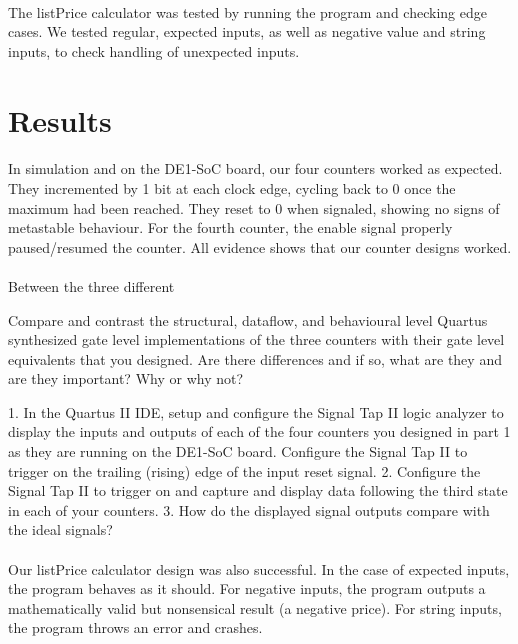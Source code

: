 \documentclass{article}
\begin{document}
  \paragraph{} The listPrice calculator was tested by running the program and checking edge cases. We tested regular, expected inputs, as well as negative value and string inputs, to check handling of unexpected inputs.

\section{Results}

  \paragraph{} In simulation and on the DE1-SoC board, our four counters worked as expected. They incremented by 1 bit at each clock edge, cycling back to 0 once the maximum had been reached. They reset to 0 when signaled, showing no signs of metastable behaviour. For the fourth counter, the enable signal properly paused/resumed the counter. All evidence shows that our counter designs worked.

  \paragraph{} Between the three different

  Compare and contrast the structural, dataflow, and behavioural level Quartus synthesized gate level implementations of the three counters with their gate level equivalents that you designed. Are there differences and if so, what are they and are they important? Why or why not?

  1. In the Quartus II IDE, setup and configure the Signal Tap II logic analyzer to display the inputs and outputs of each of the four counters you designed in part 1 as they are running on the DE1-SoC board. Configure the Signal Tap II to trigger on the trailing (rising) edge of the input reset signal.
2. Configure the Signal Tap II to trigger on and capture and display data following the third state in each of your counters.
3. How do the displayed signal outputs compare with the ideal signals?


  \paragraph{} Our listPrice calculator design was also successful. In the case of expected inputs, the program behaves as it should. For negative inputs, the program outputs a mathematically valid but nonsensical result (a negative price). For string inputs, the program throws an error and crashes.
\end{document}
